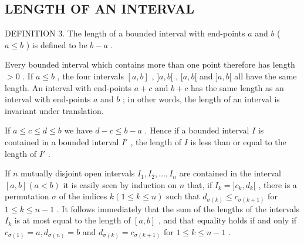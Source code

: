 \subsection{LENGTH OF AN INTERVAL}

DEFINITION 3. The length of a bounded interval with end-points \(a\) and \(b\) ( \(a \leqslant b\) ) is defined to be \(b - a\) .

Every bounded interval which contains more than one point therefore has length \(> 0\) . If \(a \leqslant b\) , the four intervals \([a, b]\) , \(]a, b[\) , \([a, b[\) and \(]a, b[\) all have the same length. An interval with end-points \(a + c\) and \(b + c\) has the same length as an interval with end-points \(a\) and \(b\) ; in other words, the length of an interval is invariant under translation.

If \(a \leqslant c \leqslant d \leqslant b\) we have \(d - c \leqslant b - a\) . Hence if a bounded interval \(I\) is contained in a bounded interval \(I'\) , the length of \(I\) is less than or equal to the length of \(I'\) .

If \(n\) mutually disjoint open intervals \(I_1, I_2, \ldots, I_n\) are contained in the interval \([a, b] (a < b)\) it is easily seen by induction on \(n\) that, if \(I_k = ]c_k, d_k[\) , there is a permutation \(\sigma\) of the indices \(k (1 \leqslant k \leqslant n)\) such that \(d_{\sigma(k)} \leqslant c_{\sigma(k+1)}\) for \(1 \leqslant k \leqslant n - 1\) . It follows immediately that the sum of the lengths of the intervals \(I_k\) is at most equal to the length of \([a, b]\) , and that equality holds if and only if \(c_{\sigma(1)} = a, d_{\sigma(n)} = b\) and \(d_{\sigma(k)} = c_{\sigma(k+1)}\) for \(1 \leqslant k \leqslant n - 1\) .

